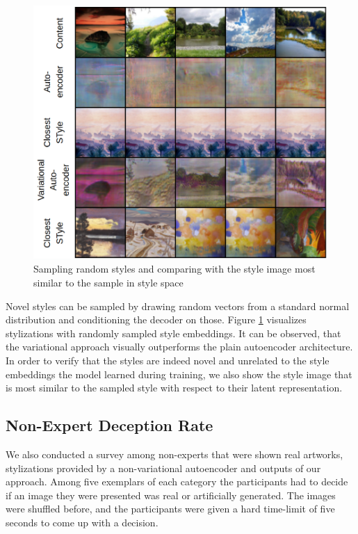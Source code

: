 \documentclass[10pt,twocolumn,letterpaper]{article}
\begin{document}
\begin{figure}
\centering
\includegraphics[width=0.9\linewidth]{sampling.png}
\caption{Sampling random styles and comparing with the style image most similar to the sample in style space}
\label{fig:sampling}
\end{figure}

Novel styles can be sampled by drawing random vectors from a standard normal distribution and conditioning the decoder on those. Figure \ref{fig:sampling} visualizes stylizations with randomly sampled style embeddings. It can be observed, that the variational approach visually outperforms the plain autoencoder architecture. In order to verify that the styles are indeed novel and unrelated to the style embeddings the model learned during training, we also show the style image that is most similar to the sampled style with respect to their latent representation. 

\subsection{Non-Expert Deception Rate}

We also conducted a survey among non-experts that were shown real artworks, stylizations provided by a non-variational autoencoder and outputs of our approach. Among five exemplars of each category the participants had to decide if an image they were presented was real or artificially generated. The images were shuffled before, and the participants were given a hard time-limit of five seconds to come up with a decision.
\end{document}
